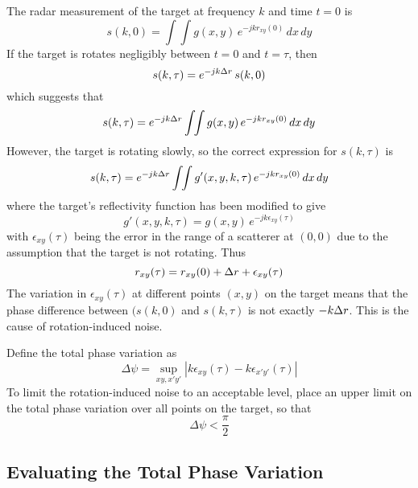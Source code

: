 The radar measurement of the target at frequency $k$ and time $t=0$ is
\begin{equation}
s(k,0)=\int\!\!\int g(x,y)\,e^{-jkr_{xy}(0)}\,dx\,dy
\end{equation}
If the target is rotates negligibly between $t=0$ and $t=\tau$, then 
\begin{equation}
s(k,\tau)=e^{-jk{\Delta r}} \,s(k,0)
\end{equation}
which suggests that
\begin{equation}
s(k,\tau)=e^{-jk{\Delta r}}\int\!\!\int g(x,y)\,e^{-jkr_{xy}(0)}\,dx\,dy
\end{equation}
However, the target is rotating slowly, so the correct expression for
$s(k,\tau)$ is
\begin{equation}
s(k,\tau)=e^{-jk{\Delta r}}\int\!\!\int g'(x,y,k,\tau)\,e^{-jkr_{xy}(0)}\,dx\,dy
\end{equation}
where the target's reflectivity function has been modified to give
\begin{equation}
g'(x,y,k,\tau)=g(x,y)\,e^{-jk\epsilon_{xy}(\tau)}
\end{equation}
with $\epsilon_{xy}(\tau)$ being the error in the range of a scatterer at
$(0,0)$ due to the assumption that the target is not rotating.  Thus
\begin{equation}
r_{xy}(\tau)=r_{xy}(0)+{\Delta r}+\epsilon_{xy}(\tau)
\end{equation}
The variation in $\epsilon_{xy}(\tau)$ at different points $(x,y)$ on the
target means that the phase difference between $(s(k,0)$ and $s(k,\tau)$ is
not exactly $-k{\Delta r}$.  This is the cause of rotation-induced noise.

Define the total phase variation as
\begin{equation}
\Delta\psi=\sup_{xy,x'y'}\left|k\epsilon_{xy}(\tau)-k\epsilon_{x'y'}(\tau)
\right|
\end{equation}
To limit the rotation-induced noise to an acceptable level, place an upper 
limit on the total phase variation over all points on the target, so that
\begin{equation}
\Delta\psi<\frac{\pi}{2}
\end{equation}

\subsection{Evaluating the Total Phase Variation}

